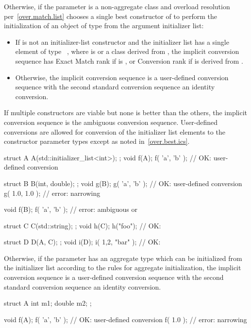 \pnum
Otherwise, if the parameter is a non-aggregate class  and overload
resolution per~\ref{over.match.list} chooses a single best constructor  of
 to perform the initialization of an object of type  from the
argument initializer list:
\begin{itemize}
\item
If  is not an initializer-list constructor
and the initializer list has a single element of type \cv{}~,
where  is  or a class derived from ,
the implicit conversion sequence has Exact Match rank if  is ,
or Conversion rank if  is derived from .
\item
Otherwise, the implicit conversion sequence is a user-defined
conversion sequence with the second standard conversion sequence an
identity conversion.
\end{itemize}
If multiple constructors are viable but none is better than
the others, the implicit conversion sequence is the ambiguous conversion
sequence. User-defined conversions are allowed for conversion of the initializer
list elements to the constructor parameter types except as noted
in~\ref{over.best.ics}.
\begin{example}
\begin{codeblock}
struct A {
  A(std::initializer_list<int>);
};
void f(A);
f( {'a', 'b'} );        // OK:  user-defined conversion

struct B {
  B(int, double);
};
void g(B);
g( {'a', 'b'} );        // OK:  user-defined conversion
g( {1.0, 1.0} );        // error: narrowing

void f(B);
f( {'a', 'b'} );        // error: ambiguous  or 

struct C {
  C(std::string);
};
void h(C);
h({"foo"});             // OK: 

struct D {
  D(A, C);
};
void i(D);
i({ {1,2}, {"bar"} });  // OK: 
\end{codeblock}
\end{example}

\pnum
Otherwise, if the parameter has an aggregate type which can be initialized from
the initializer list according to the rules for aggregate
initialization, the implicit conversion sequence is a
user-defined conversion sequence with the second standard conversion
sequence an identity conversion. \begin{example}
\begin{codeblock}
struct A {
  int m1;
  double m2;
};

void f(A);
f( {'a', 'b'} );        // OK:  user-defined conversion
f( {1.0} );             // error: narrowing
\end{codeblock}
\end{example}

